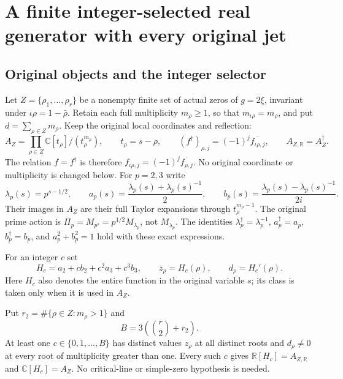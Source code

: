\section{A finite integer-selected real generator with every original jet}\label{sec:constructive-generator}

\subsection{Original objects and the integer selector}

Let $Z=\{\rho_1,\ldots,\rho_r\}$ be a nonempty finite set of actual
zeros of $g=2\xi$, invariant under $\iota\rho=1-\bar\rho$.
Retain each full multiplicity $m_\rho\geq1$, so that
$m_{\iota\rho}=m_\rho$, and put $d=\sum_{\rho\in Z}m_\rho$.
Keep the original local coordinates and reflection:
\begin{equation}
 A_Z=\prod_{\rho\in Z}\mathbb{C}[t_\rho]/(t_\rho^{m_\rho}),\qquad
 t_\rho=s-\rho,\qquad
 (f^\dagger)_{\rho,j}=(-1)^j\overline{f_{\iota\rho,j}},\qquad
 A_{Z,\mathbb{R}}=A_Z^{\dagger}.
 \tag{CG1}\label{cg:original}
\end{equation}
The relation $f=f^\dagger$ is therefore
$f_{\iota\rho,j}=(-1)^j\overline{f_{\rho,j}}$.
No original coordinate or multiplicity is changed below.
For $p=2,3$ write
\begin{equation}
 \lambda_p(s)=p^{s-1/2},\qquad
 a_p(s)=\frac{\lambda_p(s)+\lambda_p(s)^{-1}}2,\qquad
 b_p(s)=\frac{\lambda_p(s)-\lambda_p(s)^{-1}}{2i}.
 \tag{CG2}\label{cg:prime}
\end{equation}
Their images in $A_Z$ are their full Taylor expansions through
$t_\rho^{m_\rho-1}$. The original prime action is
$\Pi_p=M_{p^s}=p^{1/2}M_{\lambda_p}$, not $M_{\lambda_p}$.
The identities $\lambda_p^\dagger=\lambda_p^{-1}$,
$a_p^\dagger=a_p$, $b_p^\dagger=b_p$, and $a_p^2+b_p^2=1$
hold with these exact expressions.

For an integer $c$ set
\begin{equation}
 H_c=a_2+c b_2+c^2a_3+c^3b_3,\qquad
 z_\rho=H_c(\rho),\qquad d_\rho=H_c'(\rho).
 \tag{CG3}\label{cg:generator}
\end{equation}
Here $H_c$ also denotes the entire function in the original variable
$s$; its class is taken only when it is used in $A_Z$.

\begin{theorem}\label{cg:selector-thm}
Put $r_2=\#\{\rho\in Z:m_\rho>1\}$ and
\begin{equation}
 B=3\left(\binom r2+r_2\right).
 \tag{CG4}\label{cg:bound}
\end{equation}
At least one $c\in\{0,1,\ldots,B\}$ has distinct values $z_\rho$
at all distinct roots and $d_\rho\ne0$ at every root of multiplicity greater than one. Every such
$c$ gives $\mathbb{R}[H_c]=A_{Z,\mathbb{R}}$ and $\mathbb{C}[H_c]=A_Z$.
No critical-line or simple-zero hypothesis is needed.
\end{theorem}

